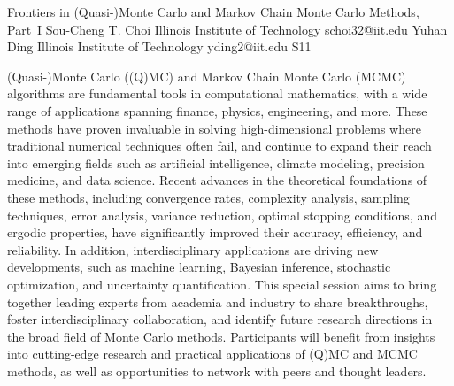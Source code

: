 \begin{session}
 {Frontiers in (Quasi-)Monte Carlo and Markov Chain Monte Carlo Methods, Part~I}%
 {Sou-Cheng T. Choi}%
 {Illinois Institute of Technology}%
 {schoi32@iit.edu}%
 {Yuhan Ding}%
 {Illinois Institute of Technology}%
 {yding2@iit.edu}%
 {S11}%
{}

 (Quasi-)Monte Carlo ((Q)MC) and Markov Chain Monte Carlo (MCMC) algorithms are fundamental tools in computational mathematics, with a wide range of applications spanning finance, physics, engineering, and more. These methods have proven invaluable in solving high-dimensional problems where traditional numerical techniques often fail, and continue to expand their reach into emerging fields such as artificial intelligence, climate modeling, precision medicine, and data science.
 Recent advances in the theoretical foundations of these methods, including convergence rates, complexity analysis, sampling techniques, error analysis, variance reduction, optimal stopping conditions, and ergodic properties, have significantly improved their accuracy, efficiency, and reliability. In addition, interdisciplinary applications are driving new developments, such as machine learning, Bayesian inference, stochastic optimization, and uncertainty quantification.
 This special session aims to bring together leading experts from academia and industry to share breakthroughs, foster interdisciplinary collaboration, and identify future research directions in the broad field of Monte Carlo methods. Participants will benefit from insights into cutting-edge research and practical applications of (Q)MC and MCMC methods, as well as opportunities to network with peers and thought leaders.
\end{session}



\clearpage


